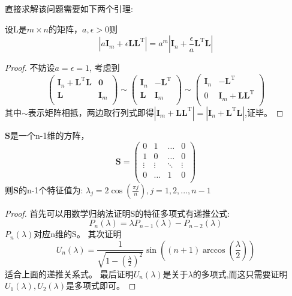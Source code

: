 直接求解该问题需要如下两个引理:
\begin{lemma}\label{lemma:change}
设L是$m\times n$的矩阵，$a,\epsilon > 0$则
\begin{equation}
|a\bm{I}_m+\epsilon \bm{L}\bm{L}^{\textrm{T}} |=a^m|\bm{I}_n+\frac{\epsilon}{a} \bm{L}^{\textrm{T}} \bm{L}|
\end{equation}
\end{lemma}
\begin{proof}
不妨设$a=\epsilon=1$,
考虑到
\[
\left(\begin{array}{cc}
\bm{I}_n+\bm{L}^{\textrm{T}} \bm{L}&\bm{0}\\
\bm{L}&\bm{I}_m\\
\end{array}\right)\sim\left(\begin{array}{cc}
\bm{I}_n&-\bm{L}^{\textrm{T}} \\
\bm{L}&\bm{I}_m\\
\end{array}\right)\sim\left(\begin{array}{cc}
\bm{I}_n&-\bm{L}^{\textrm{T}} \\
0&\bm{I}_m+\bm{L}\bm{L}^{\textrm{T}} \\
\end{array}\right)
\]
其中$\sim$表示矩阵相抵，两边取行列式即得$|\bm{I}_m+\bm{L}\bm{L}^{\textrm{T}} |=|\bm{I}_n+\bm{L}^{\textrm{T}} \bm{L}|$,证毕。
\end{proof}


\begin{lemma}\label{lemma:special}
$\bm{S}$是一个n-1维的方阵，\[
\bm{S}=\left(
\begin{array}{cccc}
0&1&\dots&0\\
1&0&\dots&0\\
\vdots&\vdots&\ddots&\vdots\\
0&\dots&1&0\\
\end{array}\right)
\]则$\bm{S}$的n-1个特征值为:
$\lambda_j=2\cos(\frac{\pi j}{n}),j=1,2,...,n-1$
\end{lemma}
\begin{proof}
首先可以用数学归纳法证明S的特征多项式有递推公式:\[
P_n(\lambda)=\lambda P_{n-1}(\lambda)-P_{n-2}(\lambda)
\]
$P_n(\lambda)$对应n维的S。
其次证明
\[
U_n(\lambda)=\frac{1}{\sqrt{1-(\frac{\lambda}{2})^2}}\sin((n+1)\arccos(\frac{\lambda}{2}))
\]
适合上面的递推关系式。
最后证明$U_n(\lambda)$是关于$\lambda$的多项式,而这只需要证明$U_1(\lambda),U_2(\lambda)$是多项式即可。
\end{proof}

